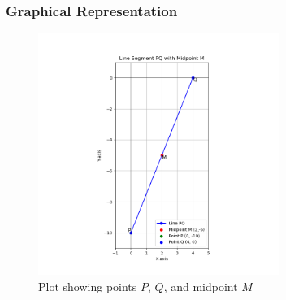 \documentclass{beamer}
\theoremstyle{remark}
\begin{document}
\begin{frame}
\frametitle{Graphical Representation}
\begin{figure}[h!]
\centering
\includegraphics[width=0.7\textwidth]{Figure_1.png}
\caption{Plot showing points $ P $, $ Q $, and midpoint $ M $}
\label{fig:graph}
\end{figure}
\end{frame}
\end{document}
